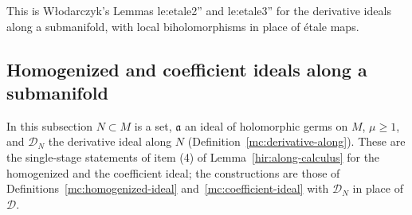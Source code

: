 This is Włodarczyk's Lemmas le:etale2'' and le:etale3'' for the derivative ideals along a submanifold, with local biholomorphisms in place of étale maps.

\subsection{Homogenized and coefficient ideals along a submanifold}

In this subsection \(N\subset M\) is a set, \(\mathfrak a\) an ideal of holomorphic germs on \(M\), \(\mu\ge1\), and \(\mathcal D_N\) the derivative ideal along \(N\)
(Definition~\ref{mc:derivative-along}). These are the single-stage statements of item (4) of Lemma~\ref{hir:along-calculus} for the homogenized and the
coefficient ideal; the constructions are those of Definitions~\ref{mc:homogenized-ideal} and~\ref{mc:coefficient-ideal} with \(\mathcal D_N\) in place of \(\mathcal D\).

